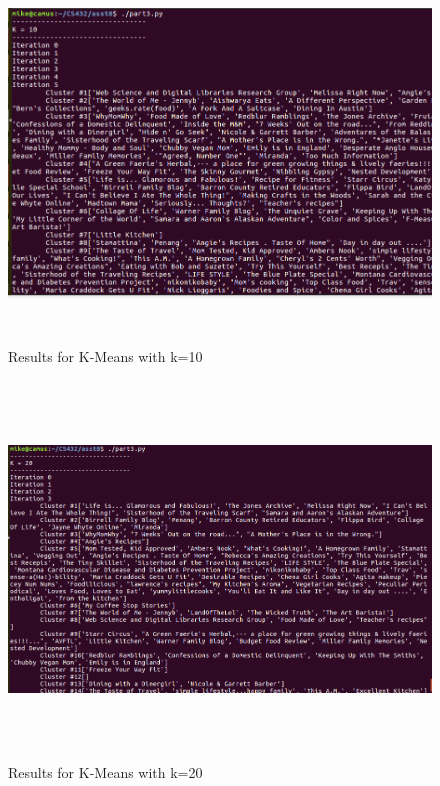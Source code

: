 \documentclass{article}
\begin{document}
\begin{figure}[H]
 \centering
 	\includegraphics[height=10cm]{q3k10.png}
  \caption{Results for K-Means with k=10}
\end{figure}

\begin{figure}[H]
 \centering
 	\includegraphics[height=10cm]{q3k20.png}
  \caption{Results for K-Means with k=20}
\end{figure}



\end{document}
